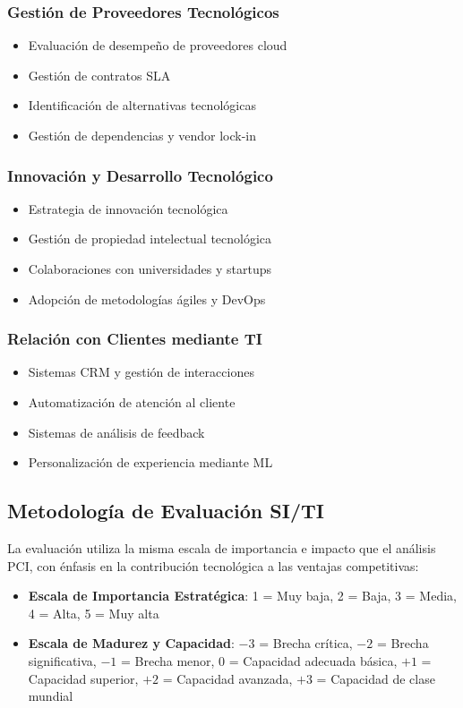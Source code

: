 \subsubsection{Gestión de Proveedores Tecnológicos}
\begin{itemize}
\item Evaluación de desempeño de proveedores cloud
\item Gestión de contratos SLA
\item Identificación de alternativas tecnológicas
\item Gestión de dependencias y vendor lock-in
\end{itemize}

\subsubsection{Innovación y Desarrollo Tecnológico}
\begin{itemize}
\item Estrategia de innovación tecnológica
\item Gestión de propiedad intelectual tecnológica
\item Colaboraciones con universidades y startups
\item Adopción de metodologías ágiles y DevOps
\end{itemize}

\subsubsection{Relación con Clientes mediante TI}
\begin{itemize}
\item Sistemas CRM y gestión de interacciones
\item Automatización de atención al cliente
\item Sistemas de análisis de feedback
\item Personalización de experiencia mediante ML
\end{itemize}

\subsection{Metodología de Evaluación SI/TI}

La evaluación utiliza la misma escala de importancia e impacto que el análisis PCI, con énfasis en la contribución tecnológica a las ventajas competitivas:

\begin{itemize}
\item \textbf{Escala de Importancia Estratégica}: 1 = Muy baja, 2 = Baja, 3 = Media, 4 = Alta, 5 = Muy alta
\item \textbf{Escala de Madurez y Capacidad}: $-3$ = Brecha crítica, $-2$ = Brecha significativa, $-1$ = Brecha menor, 0 = Capacidad adecuada básica, $+1$ = Capacidad superior, $+2$ = Capacidad avanzada, $+3$ = Capacidad de clase mundial
\end{itemize}

